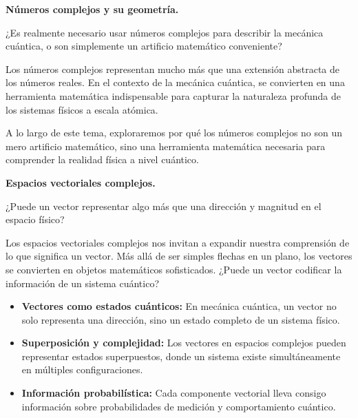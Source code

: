 \documentclass[]{unirTema}
\begin{document}
\author{Francisco Costa Cano}

\begin{questions}

  \question \textbf{Números complejos y su geometría.}

  ¿Es realmente necesario usar números complejos para describir la mecánica cuántica, o son simplemente un artificio matemático conveniente?

  Los números complejos representan mucho más que una extensión abstracta de los números reales. En el contexto de la mecánica cuántica, se convierten en una herramienta matemática indispensable para capturar la naturaleza profunda de los sistemas físicos a escala atómica.

  \begin{solution}
    A lo largo de este tema, exploraremos por qué los números complejos no son un mero artificio matemático, sino una herramienta matemática necesaria para comprender la realidad física a nivel cuántico.
  \end{solution}

  \question \textbf{Espacios vectoriales complejos.}

  ¿Puede un vector representar algo más que una dirección y magnitud en el espacio físico?

  Los espacios vectoriales complejos nos invitan a expandir nuestra comprensión de lo que significa un vector. Más allá de ser simples flechas en un plano, los vectores se convierten en objetos matemáticos sofisticados. ¿Puede un vector codificar la información de un sistema cuántico?

  \begin{solution}

    \begin{itemize}
      \item \textbf{Vectores como estados cuánticos:} En mecánica cuántica, un vector no solo representa una dirección, sino un estado completo de un sistema físico.

      \item \textbf{Superposición y complejidad:} Los vectores en espacios complejos pueden representar estados superpuestos, donde un sistema existe simultáneamente en múltiples configuraciones.

      \item \textbf{Información probabilística:} Cada componente vectorial lleva consigo información sobre probabilidades de medición y comportamiento cuántico.
    \end{itemize}


\end{solution}
\end{questions}
\end{document}
